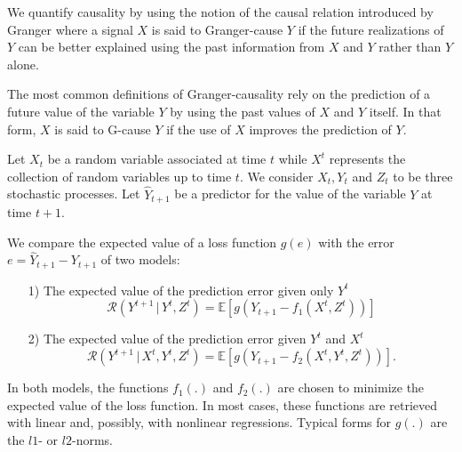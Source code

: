 
We quantify causality by using the notion of the causal relation introduced by Granger where a signal $X$ is said to Granger-cause $Y$ if the future realizations of $Y$ can be better explained using the past information from $X$ and $Y$ rather than $Y$ alone.

The most common definitions of Granger-causality rely on the prediction of a future
value of the variable $Y$ by using the past values of $X$ and $Y$ itself. %
In that form, $X$ is said to G-cause $Y$ if the use of $X$ improves the prediction of $Y$.

Let $X_t$ be a random variable associated at time $t$ while $X^t$ represents the collection of random variables up to time $t$.
We consider ${X_t}, {Y_t}$ and ${Z_t}$ to be three stochastic processes.
Let $\hat Y_{t+1}$ be a predictor for the value of the variable $Y$ at time $t+1$.

We compare the expected value of a loss function $g(e)$ with the error $e=\hat{Y}_{t+1} - Y_{t+1}$ of two models:
\begin{itemize}
\item[1)] The expected value of the prediction error given only $Y^t$
\begin{equation}
 \mathcal{R}(Y^{t+1} \, | \, Y^t,Z^t) = \mathbb{E}[g(Y_{t+1} - f_1(X^{t},Z^t))]
\end{equation}
\item[2)] The expected value of the prediction error given $Y^t$ and $X^t$
\begin{equation}
 \mathcal{R}(Y^{t+1} \, | \, X^{t},Y^t,Z^t) = \mathbb{E}[g(Y_{t+1} - f_2(X^{t},Y^t,Z^t))].
\end{equation}
\end{itemize}
In both models, the functions $f_1(.)$ and $f_2(.)$ are chosen to minimize the expected value of the loss function.  In most cases, these functions are retrieved with linear and, possibly, with nonlinear regressions.
Typical forms for $g(.)$ are the $l1$- or $l2$-norms.

